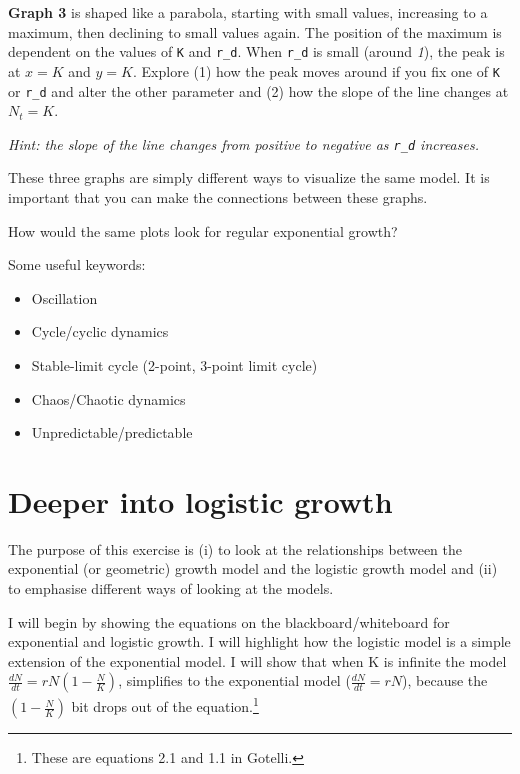 \documentclass[
  a4paper]{book}
\providecommand{\tightlist}{%
  \setlength{\itemsep}{0pt}\setlength{\parskip}{0pt}}
\begin{document}
\textbf{Graph 3} is shaped like a parabola, starting with small values,
increasing to a maximum, then declining to small values again. The
position of the maximum is dependent on the values of \texttt{K} and
\texttt{r\_d}. When \texttt{r\_d} is small (around \emph{1}), the peak
is at \(x = K\) and \(y = K\). Explore (1) how the peak moves around if
you fix one of \texttt{K} or \texttt{r\_d} and alter the other parameter
and (2) how the slope of the line changes at \(N_t = K\).

\emph{Hint: the slope of the line changes from positive to negative as
\texttt{r\_d} increases.}

\begin{do-something}
These three graphs are simply different ways to visualize the same
model. It is important that you can make the connections between these
graphs.

How would the same plots look for regular exponential growth?
\end{do-something}

Some useful keywords:

\begin{itemize}
\tightlist
\item
  Oscillation
\item
  Cycle/cyclic dynamics
\item
  Stable-limit cycle (2-point, 3-point limit cycle)
\item
  Chaos/Chaotic dynamics
\item
  Unpredictable/predictable
\end{itemize}

\hypertarget{deeper-into-logistic-growth}{%
\chapter{Deeper into logistic
growth}\label{deeper-into-logistic-growth}}

The purpose of this exercise is (i) to look at the relationships between
the exponential (or geometric) growth model and the logistic growth
model and (ii) to emphasise different ways of looking at the models.

I will begin by showing the equations on the blackboard/whiteboard for
exponential and logistic growth. I will highlight how the logistic model
is a simple extension of the exponential model. I will show that when K
is infinite the model \(\frac{d N}{d t}=r N\left(1-\frac{N}{K}\right)\),
simplifies to the exponential model (\(\frac{d N}{d t}=r N\)), because
the \((1-\frac{N}{K})\) bit drops out of the equation.\footnote{These
  are equations 2.1 and 1.1 in Gotelli.}
\end{document}
